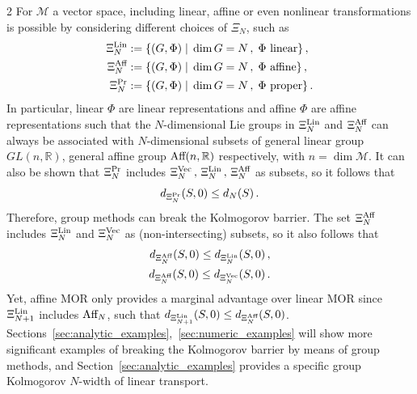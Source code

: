 \documentclass{article}
\newcommand{\M}{\mathcal{M}}                                %
\newcommand{\R}{\mathbb{R}}                                 %
\begin{document}
\begin{multicols}{2}
For $\M$ a vector space, including linear, affine or even nonlinear transformations is possible by considering different choices of $\Xi_N$, such as 
\begin{align}
    \Xi^\textnormal{Lin}_N &:= \{(G,\Phi) \; | \;  \dim G = N\,,\; \Phi \textnormal{ linear} \} \,,\\
    \Xi^\textnormal{Aff}_N &:= \{(G,\Phi) \; | \;  \dim G = N\,,\; \Phi \textnormal{ affine} \} \,,\\
    \Xi^\textnormal{Pr}_N &:= \{(G,\Phi) \; | \;  \dim G = N\,,\; \Phi \textnormal{ proper} \} \,.
\end{align}
In particular, linear $\Phi$ are linear representations %
and affine $\Phi$ are affine representations %
such that the $N$-dimensional Lie groups in $\Xi^\textnormal{Lin}_N$ and $\Xi^\textnormal{Aff}_N$ can always be associated with $N$-dimensional subsets of general linear group $GL(n,\R)$, general affine group $\textnormal{Aff}(n,\R)$ respectively, with $n = \dim \M$.
It can also be shown that $\Xi^\textnormal{Pr}_N$ includes $\Xi^{\textnormal{Vec}}_N\,,\,\Xi^\textnormal{Lin}_N\,,\,\Xi^\textnormal{Aff}_N$ as subsets, so it follows that 
\begin{equation}
    d_{\Xi^\textnormal{Pr}_N}(S,0) \leq d_N(S)\,.
\end{equation}
Therefore, group methods can break the Kolmogorov barrier. The set $\Xi^\textnormal{Aff}_N$ includes $\Xi^\textnormal{Lin}_N$ and $\Xi^{\textnormal{Vec}}_N$ as (non-intersecting) subsets, so it also follows that
\begin{align}
    d_{\Xi^\textnormal{Aff}_N}(S,0) \leq d_{\Xi^\textnormal{Lin}_N}(S,0)\,,\\
    d_{\Xi^\textnormal{Aff}_N}(S,0) \leq d_{\Xi^\textnormal{Vec}_N}(S,0)\,.
\end{align}
Yet, affine MOR  only provides a marginal advantage over linear MOR since $\Xi^\textnormal{Lin}_{N+1}$ includes $\textnormal{Aff}_{N}$, such that $d_{\Xi^\textnormal{Lin}_{N+1}}(S,0) \leq d_{\Xi^\textnormal{Aff}_{N}}(S,0)$. Sections~\ref{sec:analytic_examples},~\ref{sec:numeric_examples} will show more significant examples of breaking the Kolmogorov barrier by means of group methods, and Section~\ref{sec:analytic_examples} provides a specific group Kolmogorov $N$-width of linear transport.

\end{multicols}
\end{document}
